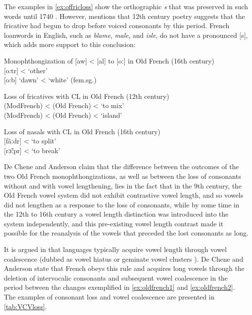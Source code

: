 \documentclass[output=paper,
modfonts
]{LSP/langsci}
\begin{document}
The examples in \cref{ex:offricloss} show the orthographic \emph{s} that was preserved
in such words until 1740 \citep[520]{deChene1979}. However,
\citet[151]{pope1934} mentions that 12th century poetry suggests that the
fricative had begun to drop before voiced consonants by this period.
French loanwords in English, such as \emph{blame}, \emph{male}, and
\emph{isle}, do not have a pronounced {[}s{]}, which adds more support
to this conclusion:

\ea\label{ex:oldfrench2}
	\ea\label{ex:monoalawo}Monophthongization of {[}aw{]} \textless{} {[}al{]} to {[}oː{]} in Old French (16th century)\\
	 {[}o:tr{]} \textless{}  `other'\\
	 {[}o:b{]} `dawn' \textless{}  `white' (fem.sg.)
	
	\ex\label{ex:offricloss}Loss of fricatives with CL in Old French (12th century)\\
	 (ModFrench) \textless{}  (Old French) \textless{}  `to mix'\\
	 (ModFrench) \textless{}  (Old French) \textless{}  `island'
	
	\ex\label{ex:ofnasloss}Loss of nasals with CL in Old French (16th century)\\
	 {[}fãːdr{]} \textless{}  `to split'\\
	 {[}rɔ̃ːpr{]} \textless{}  `to break'
	\z
\z

De Chene and Anderson claim that the difference between the outcomes of
the two Old French monophthongizations, as well as between the loss of
consonants without and with vowel lengthening, lies in the fact that in
the 9th century, the Old French vowel system did not
exhibit contrastive vowel length, and so vowels did not lengthen as a
response to the loss of consonants, while by some time in the
12th to 16th century a vowel length
distinction was introduced into the system independently, and this
pre-existing vowel length contrast made it possible for the reanalysis
of the vowels that preceded the lost consonants as long.

It is argued in \citet{deChene1985} that languages typically acquire vowel
length through vowel coalescence (dubbed as vowel hiatus or geminate
vowel clusters \citep[520]{deChene1979}). De Chene and
Anderson \citeyearpar{deChene1979} state that French obeys this rule and acquires long
vowels through the deletion of intervocalic consonants and subsequent
vowel coalescence in the period between the changes exemplified in \cref{ex:oldfrench1}
and \cref{ex:oldfrench2}. The examples of consonant loss and vowel coalescence are
presented in \cref{tab:VCVloss}.
\end{document}
